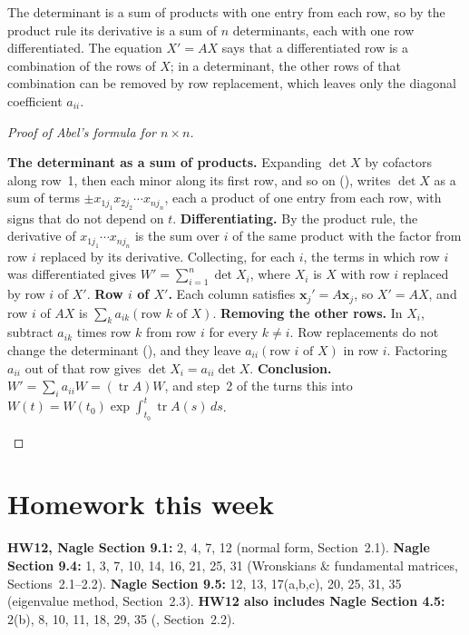 \documentclass[10pt]{scrartcl}
\newcommand{\vv}[1]{\mathbf{#1}}
\DeclareMathOperator{\tr}{tr}
\begin{document}
\begin{ideabox}
  The determinant is a sum of products with one entry from each row, so by the product rule its derivative is a sum of $n$ determinants, each with one row differentiated. The equation $X'=AX$ says that a differentiated row is a combination of the rows of $X$; in a determinant, the other rows of that combination can be removed by row replacement, which leaves only the diagonal coefficient $a_{ii}$.
\end{ideabox}

\begin{proof}[Proof of Abel's formula for $n\times n$]
  \begin{steps}
    \ii \textbf{The determinant as a sum of products.} Expanding $\det X$ by cofactors along row~1, then each minor along its first row, and so on (), writes $\det X$ as a sum of terms $\pm x_{1j_1}x_{2j_2}\cdots x_{nj_n}$, each a product of one entry from each row, with signs that do not depend on $t$.
    \ii \textbf{Differentiating.} By the product rule, the derivative of $x_{1j_1}\cdots x_{nj_n}$ is the sum over $i$ of the same product with the factor from row $i$ replaced by its derivative. Collecting, for each $i$, the terms in which row $i$ was differentiated gives $W'=\sum_{i=1}^n\det X_i$, where $X_i$ is $X$ with row $i$ replaced by row $i$ of $X'$.
    \ii \textbf{Row $i$ of $X'$.} Each column satisfies $\vv x_j'=A\vv x_j$, so $X'=AX$, and row $i$ of $AX$ is $\sum_{k}a_{ik}(\text{row }k\text{ of }X)$.
    \ii \textbf{Removing the other rows.} In $X_i$, subtract $a_{ik}$ times row $k$ from row $i$ for every $k\neq i$. Row replacements do not change the determinant (), and they leave $a_{ii}(\text{row }i\text{ of }X)$ in row $i$. Factoring $a_{ii}$ out of that row gives $\det X_i=a_{ii}\det X$.
    \ii \textbf{Conclusion.} $W'=\sum_ia_{ii}W=(\tr A)W$, and step~2 of the  turns this into $W(t)=W(t_0)\exp\int_{t_0}^t\tr A(s)\,ds$. \qedhere
  \end{steps}
\end{proof}

\section{Homework this week}
\begin{itemize}
  \ii \textbf{HW12, Nagle Section 9.1:} 2, 4, 7, 12 (normal form, Section~2.1).
  \ii \textbf{Nagle Section 9.4:} 1, 3, 7, 10, 14, 16, 21, 25, 31 (Wronskians \& fundamental matrices, Sections~2.1--2.2).
  \ii \textbf{Nagle Section 9.5:} 12, 13, 17(a,b,c), 20, 25, 31, 35 (eigenvalue method, Section~2.3).
  \ii \textbf{HW12 also includes Nagle Section 4.5:} 2(b), 8, 10, 11, 18, 29, 35 (, Section~2.2).
\end{itemize}
\end{document}
